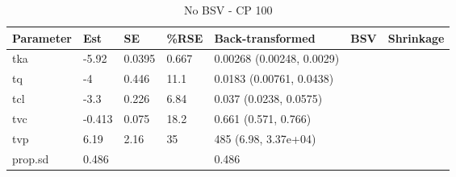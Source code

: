 \begin{table}
\centering\centering
\caption{No BSV - CP 100}
\centering
\fontsize{8}{10}\selectfont
\begin{tabular}[t]{lllllll}
\toprule
\textbf{Parameter} & \textbf{Est} & \textbf{SE} & \textbf{\%RSE} & \textbf{Back-transformed} & \textbf{BSV} & \textbf{Shrinkage}\\
\midrule
tka & -5.92 & 0.0395 & 0.667 & 0.00268 (0.00248, 0.0029) &  & \\
\midrule
tq & -4 & 0.446 & 11.1 & 0.0183 (0.00761, 0.0438) &  & \\
\midrule
tcl & -3.3 & 0.226 & 6.84 & 0.037 (0.0238, 0.0575) &  & \\
\midrule
tvc & -0.413 & 0.075 & 18.2 & 0.661 (0.571, 0.766) &  & \\
\midrule
tvp & 6.19 & 2.16 & 35 & 485 (6.98, 3.37e+04) &  & \\
\midrule
prop.sd & 0.486 &  &  & 0.486 &  & \\
\bottomrule
\end{tabular}
\end{table}